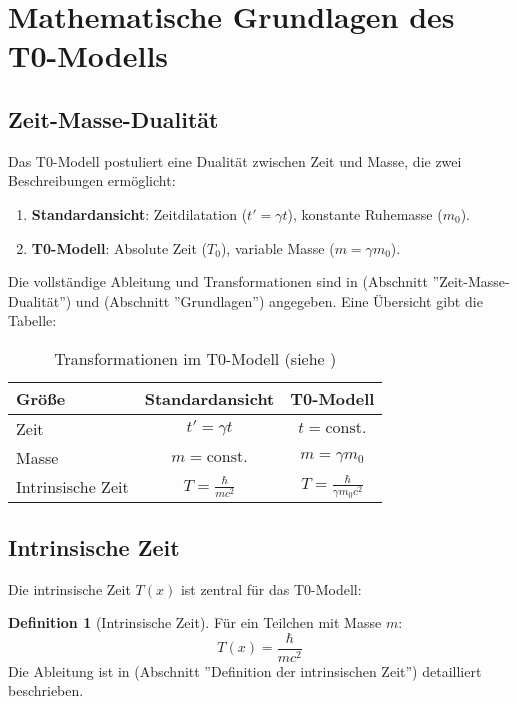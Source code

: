 \documentclass[a4paper,12pt]{article}
\theoremstyle{definition}
\newtheorem{definition}{Definition}[theorem]
\theoremstyle{remark}
\newcommand{\Tfield}{T(x)}
\begin{document}
	\section{Mathematische Grundlagen des T0-Modells}
	
	\subsection{Zeit-Masse-Dualität}
	
	Das T0-Modell postuliert eine Dualität zwischen Zeit und Masse, die zwei Beschreibungen ermöglicht:
	\begin{enumerate}
		\item \textbf{Standardansicht}: Zeitdilatation (\(t' = \gamma t\)), konstante Ruhemasse (\(m_0\)).
		\item \textbf{T0-Modell}: Absolute Zeit (\(T_0\)), variable Masse (\(m = \gamma m_0\)).
	\end{enumerate}
	Die vollständige Ableitung und Transformationen sind in \cite{pascher_params_2025} (Abschnitt ''Zeit-Masse-Dualität'') und \cite{pascher_galaxies_2025} (Abschnitt ''Grundlagen'') angegeben. Eine Übersicht gibt die Tabelle:
	
	\begin{table}[h]
		\centering
		\begin{tabular}{|l|c|c|}
			\hline
			\textbf{Größe} & \textbf{Standardansicht} & \textbf{T0-Modell} \\
			\hline
			Zeit & \(t' = \gamma t\) & \(t = \text{const.}\) \\
			Masse & \(m = \text{const.}\) & \(m = \gamma m_0\) \\
			Intrinsische Zeit & \(T = \frac{\hbar}{m c^2}\) & \(T = \frac{\hbar}{\gamma m_0 c^2}\) \\
			\hline
		\end{tabular}
		\caption{Transformationen im T0-Modell (siehe \cite{pascher_params_2025})}
	\end{table}
	
	\subsection{Intrinsische Zeit}
	
	Die intrinsische Zeit \(\Tfield\) ist zentral für das T0-Modell:
	
	\begin{definition}[Intrinsische Zeit]
		Für ein Teilchen mit Masse \(m\):
		\begin{equation}
			\Tfield = \frac{\hbar}{m c^2}
		\end{equation}
		Die Ableitung ist in \cite{pascher_params_2025} (Abschnitt ''Definition der intrinsischen Zeit'') detailliert beschrieben.
	\end{definition}
	
\end{document}
